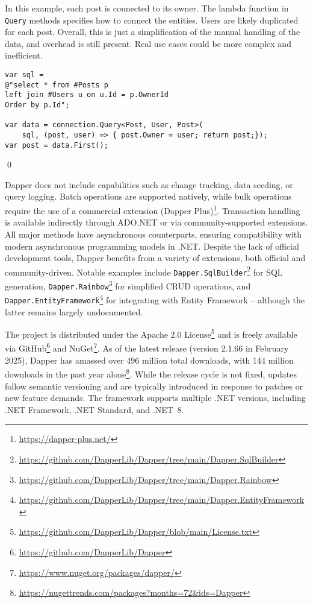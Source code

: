 \begin{example}
\small
In this example, each post is connected to its owner. The lambda function in \texttt{Query} methods specifies how to connect the entities. Users are likely duplicated for each post. Overall, this is just a simplification of the manual handling of the data, and overhead is still present. Real use cases could be more complex and inefficient.

\begin{lstlisting}[language=CSharp]
var sql =
@"select * from #Posts p
left join #Users u on u.Id = p.OwnerId
Order by p.Id";

var data = connection.Query<Post, User, Post>(
    sql, (post, user) => { post.Owner = user; return post;});
var post = data.First();
\end{lstlisting}
\qed
\end{example}

Dapper does not include capabilities such as change tracking, data seeding, or query logging. Batch operations are supported natively, while bulk operations require the use of a commercial extension (Dapper Plus)\footnote{\url{https://dapper-plus.net/}}. Transaction handling is available indirectly through ADO.NET or via community-supported extensions. All major methods have asynchronous counterparts, ensuring compatibility with modern asynchronous programming models in .NET. Despite the lack of official development tools, Dapper benefits from a variety of extensions, both official and community-driven. Notable examples include \texttt{Dapper.SqlBuilder}\footnote{\url{https://github.com/DapperLib/Dapper/tree/main/Dapper.SqlBuilder}} for SQL generation, \texttt{Dapper.Rainbow}\footnote{\url{https://github.com/DapperLib/Dapper/tree/main/Dapper.Rainbow}} for simplified CRUD operations, and \texttt{Dapper.EntityFramework}\footnote{\url{https://github.com/DapperLib/Dapper/tree/main/Dapper.EntityFramework}} for integrating with Entity Framework -- although the latter remains largely undocumented.

The project is distributed under the Apache 2.0 License\footnote{\url{https://github.com/DapperLib/Dapper/blob/main/License.txt}} and is freely available via GitHub\footnote{\url{https://github.com/DapperLib/Dapper}} and NuGet\footnote{\url{https://www.nuget.org/packages/dapper/}}. As of the latest release (version 2.1.66 in February 2025), Dapper has amassed over 496 million total downloads, with 144 million downloads in the past year alone\footnote{\url{https://nugettrends.com/packages?months=72&ids=Dapper}}. While the release cycle is not fixed, updates follow semantic versioning and are typically introduced in response to patches or new feature demands. The framework supports multiple .NET versions, including .NET Framework, .NET Standard, and .NET~8.

